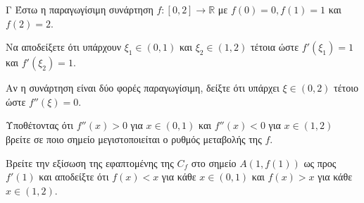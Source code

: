 \begin{thema}{Γ}
Έστω η παραγωγίσιμη συνάρτηση $f: [0, 2] \to \mathbb{R}$ με $f(0)=0, f(1)=1$ και $f(2)=2$.
\begin{erwthma}
  \item Να αποδείξετε ότι υπάρχουν $\xi_1 \in (0, 1)$ και $\xi_2 \in (1, 2)$ τέτοια ώστε $f'(\xi_1) = 1$ και $f'(\xi_2) = 1$.
  \item Αν η συνάρτηση είναι δύο φορές παραγωγίσιμη, δείξτε ότι υπάρχει $\xi\in(0,2)$ τέτοιο ώστε $f''(\xi)=0$.
  \item Υποθέτοντας ότι $f''(x) > 0$ για $x \in (0,1)$ και $f''(x) < 0$ για $x \in (1,2)$ βρείτε σε ποιο σημείο μεγιστοποιείται ο ρυθμός μεταβολής της $f$.
  \item Βρείτε την εξίσωση της εφαπτομένης της $C_f$ στο σημείο $A(1,f(1))$ ως προς $f'(1)$ και αποδείξτε ότι $f(x) < x$ για κάθε $x \in (0, 1)$ και $f(x) > x$ για κάθε $x \in (1, 2)$.
\end{erwthma}
\end{thema}
